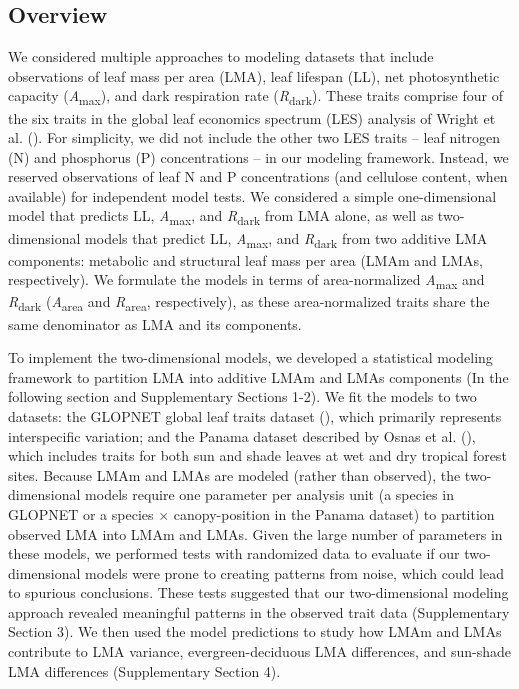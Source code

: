 \documentclass[
  12pt,
  letterpaper,
  DIV=11,
  numbers=noendperiod]{scrartcl}
\begin{document}
\subsection{Overview}\label{overview}

We considered multiple approaches to modeling datasets that include
observations of leaf mass per area (LMA), leaf lifespan (LL), net
photosynthetic capacity (\emph{A}\textsubscript{max}), and dark
respiration rate (\emph{R}\textsubscript{dark}). These traits comprise
four of the six traits in the global leaf economics spectrum (LES)
analysis of Wright et al. (). For
simplicity, we did not include the other two LES traits -- leaf nitrogen
(N) and phosphorus (P) concentrations -- in our modeling framework.
Instead, we reserved observations of leaf N and P concentrations (and
cellulose content, when available) for independent model tests. We
considered a simple one-dimensional model that predicts LL,
\emph{A}\textsubscript{max}, and \emph{R}\textsubscript{dark} from LMA
alone, as well as two-dimensional models that predict LL,
\emph{A}\textsubscript{max}, and \emph{R}\textsubscript{dark} from two
additive LMA components: metabolic and structural leaf mass per area
(LMAm and LMAs, respectively). We formulate the models in terms of
area-normalized \emph{A}\textsubscript{max} and
\emph{R}\textsubscript{dark} (\emph{A}\textsubscript{area} and
\emph{R}\textsubscript{area}, respectively), as these area-normalized
traits share the same denominator as LMA and its components.

To implement the two-dimensional models, we developed a statistical
modeling framework to partition LMA into additive LMAm and LMAs
components (In the following section and Supplementary Sections 1-2). We
fit the models to two datasets: the GLOPNET global leaf traits dataset
(), which primarily
represents interspecific variation; and the Panama dataset described by
Osnas et al. (), which includes traits for
both sun and shade leaves at wet and dry tropical forest sites. Because
LMAm and LMAs are modeled (rather than observed), the two-dimensional
models require one parameter per analysis unit (a species in GLOPNET or
a species \(\times\) canopy-position in the Panama dataset) to partition
observed LMA into LMAm and LMAs. Given the large number of parameters in
these models, we performed tests with randomized data to evaluate if our
two-dimensional models were prone to creating patterns from noise, which
could lead to spurious conclusions. These tests suggested that our
two-dimensional modeling approach revealed meaningful patterns in the
observed trait data (Supplementary Section 3). We then used the model
predictions to study how LMAm and LMAs contribute to LMA variance,
evergreen-deciduous LMA differences, and sun-shade LMA differences
(Supplementary Section 4).
\end{document}
